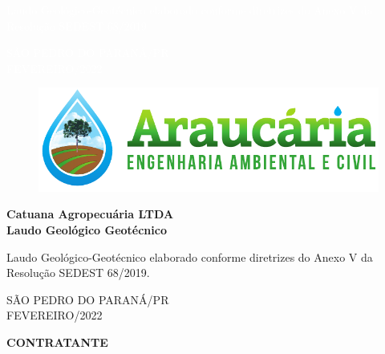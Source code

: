 \vfill

\begin{flushright}
	\begin{minipage}[h]{8cm}
		{\footnotesize \textcolor{white}{Laudo Geológico-Geotécnico elaborado conforme
				diretrizes do Anexo V da Resolução SEDEST 68/2019.}}
	\end{minipage}
\end{flushright}

\vfill

\begin{center}
	{\large \textcolor{white} {
			{SÃO PEDRO DO PARANÁ/PR\\
				FEVEREIRO/2022}}
	}
\end{center}
\newpage

\thispagestyle{empty}
\begin{figure}[t!]
	\centering
	\includegraphics[width = 7 cm]{./imagens/logo.pdf}
\end{figure}
\mbox{} 
\vspace{6.5cm}

\begin{center}
	{\Large \bfseries
		Catuana Agropecuária LTDA\\
		Laudo Geológico Geotécnico
	}
\end{center}

\vfill

\begin{flushright}
	\begin{minipage}[h]{8cm}
		{\footnotesize{Laudo Geológico-Geotécnico elaborado conforme
				diretrizes do Anexo V da Resolução SEDEST 68/2019.}}
	\end{minipage}
\end{flushright}

\vfill

\begin{center}
	{\large 
		{SÃO PEDRO DO PARANÁ/PR\\
			FEVEREIRO/2022}
	}
\end{center}

\clearpage

\thispagestyle{empty}


\textbf{CONTRATANTE} \\


